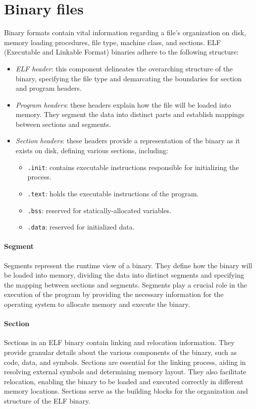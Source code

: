 \section{Binary files}

Binary formats contain vital information regarding a file's organization on disk, memory loading procedures, file type, machine class, and sections. 
ELF (Executable and Linkable Format) binaries adhere to the following structure:
\begin{itemize}
    \item \textit{ELF header}: this component delineates the overarching structure of the binary, specifying the file type and demarcating the boundaries for section and program headers.
    \item \textit{Program headers}: these headers explain how the file will be loaded into memory. 
        They segment the data into distinct parts and establish mappings between sections and segments.
    \item \textit{Section headers}: these headers provide a representation of the binary as it exists on disk, defining various sections, including:
        \begin{itemize}
            \item \texttt{.init}: contains executable instructions responsible for initializing the process.
            \item \texttt{.text}: holds the executable instructions of the program.
            \item \texttt{.bss}: reserved for statically-allocated variables.
            \item \texttt{.data}: reserved for initialized data.
        \end{itemize}
\end{itemize}

\paragraph*{Segment}
Segments represent the runtime view of a binary. 
They define how the binary will be loaded into memory, dividing the data into distinct segments and specifying the mapping between sections and segments. 
Segments play a crucial role in the execution of the program by providing the necessary information for the operating system to allocate memory and execute the binary.

\paragraph*{Section}
Sections in an ELF binary contain linking and relocation information. 
They provide granular details about the various components of the binary, such as code, data, and symbols.
Sections are essential for the linking process, aiding in resolving external symbols and determining memory layout. 
They also facilitate relocation, enabling the binary to be loaded and executed correctly in different memory locations. 
Sections serve as the building blocks for the organization and structure of the ELF binary.

